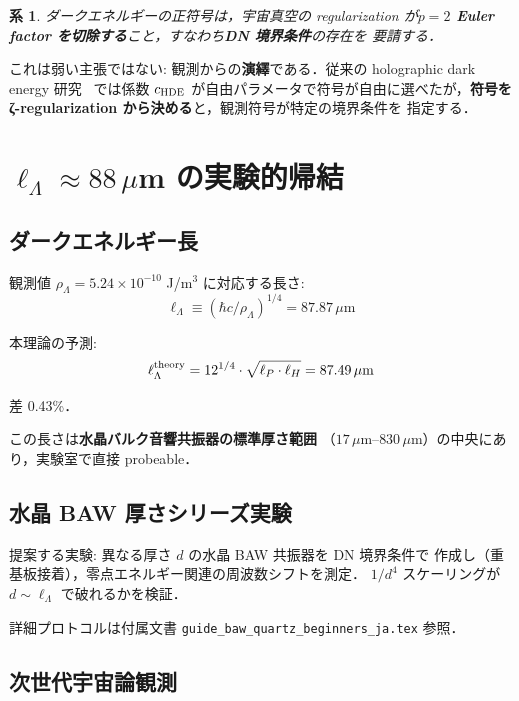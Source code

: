 \documentclass[11pt,a4paper]{article}
\newtheorem{corollary}{系}
\begin{document}
\begin{corollary}
ダークエネルギーの正符号は，宇宙真空の regularization が\textbf{$p=2$
Euler factor を切除する}こと，すなわち\textbf{DN 境界条件}の存在を
要請する．
\end{corollary}

これは弱い主張ではない: 観測からの\textbf{演繹}である．従来の
holographic dark energy 研究~\cite{Li2004,Hsu2004} では係数
$c_{\rm HDE}$ が自由パラメータで符号が自由に選べたが，\textbf{符号を
ζ-regularization から決める}と，観測符号が特定の境界条件を
指定する．

\section{$\ell_\Lambda \approx 88\,\mu$m の実験的帰結}

\subsection{ダークエネルギー長}

観測値 $\rho_\Lambda = 5.24 \times 10^{-10}$ J/m$^3$ に対応する長さ:
\begin{equation}
\ell_\Lambda \equiv (\hbar c/\rho_\Lambda)^{1/4} = 87.87\,\mu\text{m}
\end{equation}

本理論の予測:
\begin{equation}
\ell_\Lambda^{\rm theory} = 12^{1/4}\cdot\sqrt{\ell_P\cdot\ell_H}
= 87.49\,\mu\text{m}
\end{equation}

差 0.43\%．

この長さは\textbf{水晶バルク音響共振器の標準厚さ範囲}
（$17\,\mu$m--$830\,\mu$m）の中央にあり，実験室で直接 probeable．

\subsection{水晶 BAW 厚さシリーズ実験}

提案する実験: 異なる厚さ $d$ の水晶 BAW 共振器を DN 境界条件で
作成し（重基板接着），零点エネルギー関連の周波数シフトを測定．
$1/d^4$ スケーリングが $d \sim \ell_\Lambda$ で破れるかを検証．

詳細プロトコルは付属文書 \texttt{guide\_baw\_quartz\_beginners\_ja.tex}
参照．

\subsection{次世代宇宙論観測}
\end{document}
